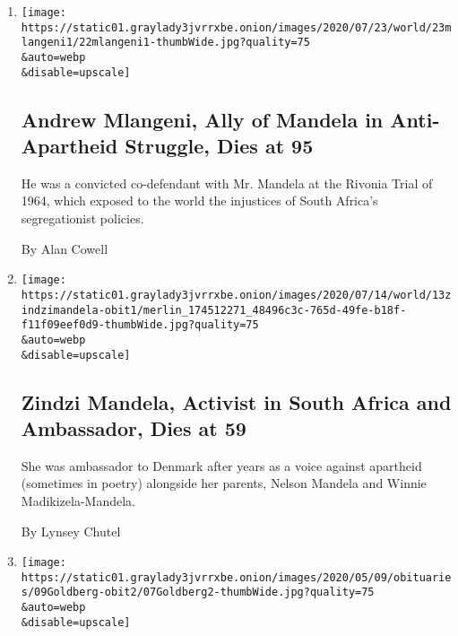 \begin{enumerate}
\def\labelenumi{\arabic{enumi}.}
\item
  \href{/2020/07/22/world/africa/andrew-mlangeni-dead.html}{}

  \texttt{[image: https://static01.graylady3jvrrxbe.onion/images/2020/07/23/world/23mlangeni1/22mlangeni1-thumbWide.jpg?quality=75\\\&auto=webp\\\&disable=upscale]}

  \hypertarget{andrew-mlangeni-ally-of-mandela-in-anti-apartheid-struggle-dies-at-95}{%
  \subsection{Andrew Mlangeni, Ally of Mandela in Anti-Apartheid
  Struggle, Dies at
  95}\label{andrew-mlangeni-ally-of-mandela-in-anti-apartheid-struggle-dies-at-95}}

  He was a convicted co-defendant with Mr. Mandela at the Rivonia Trial
  of 1964, which exposed to the world the injustices of South Africa's
  segregationist policies.

  By Alan Cowell
\item
  \href{/2020/07/13/world/africa/zindzi-mandela-dies.html}{}

  \texttt{[image: https://static01.graylady3jvrrxbe.onion/images/2020/07/14/world/13zindzimandela-obit1/merlin\_174512271\_48496c3c-765d-49fe-b18f-f11f09eef0d9-thumbWide.jpg?quality=75\\\&auto=webp\\\&disable=upscale]}

  \hypertarget{zindzi-mandela-activist-in-south-africa-and-ambassador-dies-at-59}{%
  \subsection{Zindzi Mandela, Activist in South Africa and Ambassador,
  Dies at
  59}\label{zindzi-mandela-activist-in-south-africa-and-ambassador-dies-at-59}}

  She was ambassador to Denmark after years as a voice against apartheid
  (sometimes in poetry) alongside her parents, Nelson Mandela and Winnie
  Madikizela-Mandela.

  By Lynsey Chutel
\item
  \href{/2020/05/08/world/africa/denis-goldberg-dead.html}{}

  \texttt{[image: https://static01.graylady3jvrrxbe.onion/images/2020/05/09/obituaries/09Goldberg-obit2/07Goldberg2-thumbWide.jpg?quality=75\\\&auto=webp\\\&disable=upscale]}

  \hypertarget{denis-goldberg-south-african-freedom-fighter-is-dead-at-87}{%
}
\end{enumerate}
